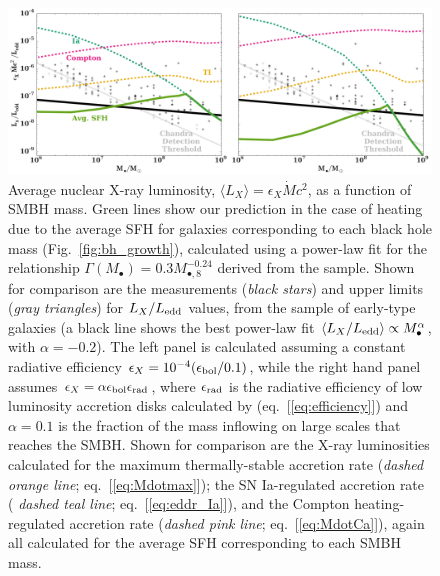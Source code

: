 \documentclass[usenatbib,fleqn]{mn2e}
\newcommand{\Mdot}{\dot{M}}
\newcommand{\Mbheight}{M_{\bullet,8}}
\begin{document}
\begin{figure}
\includegraphics[width=\textwidth]{miller.pdf}
\caption{\label{fig:miller} Average nuclear X-ray luminosity, $\langle
  L_X \rangle = \epsilon_X \Mdot c^2$, as a function of SMBH mass.
  Green lines show our prediction in the case of heating due to the
  average SFH for galaxies corresponding to each black hole mass
  (Fig.~\ref{fig:bh_growth}), calculated using a power-law fit for the
  relationship $\Gamma(M_{\bullet})=0.3 \Mbheight^{-0.24}$ derived from the
  \citet{LauerFaber+:2007a} sample.  Shown for comparison are the
  measurements ({\it black stars}) and upper limits ({\it gray
    triangles}) for $L_X/L_{\rm edd}$ values, from the
  \citet{Miller+15} sample of early-type galaxies (a black line shows
  the best power-law fit $\langle L_X/L_{\rm edd}\rangle \propto
  M_{\bullet}^{\alpha}$, with $\alpha = -0.2$).  The left panel is
  calculated assuming a constant radiative efficiency
  $\epsilon_X=10^{-4} (\epsilon_{\rm bol}/0.1)$, while the right hand
  panel assumes $\epsilon_X= \alpha \epsilon_{\rm bol}\epsilon_{\rm rad}$, where $\epsilon_{\rm rad}$ is the radiative efficiency of low luminosity accretion disks calculated by \citet{Sharma+2007} (eq.~[\ref{eq:efficiency}]) and $\alpha = 0.1$ is the fraction of the mass inflowing on large scales that reaches the SMBH.  Shown
  for comparison are the X-ray luminosities calculated for the maximum
  thermally-stable accretion rate ({\it dashed orange line};
  eq.~[\ref{eq:Mdotmax}]); the SN Ia-regulated accretion rate ({\it
    dashed teal line}; eq.~[\ref{eq:eddr_Ia}]), and the Compton
  heating-regulated accretion rate ({\it dashed pink line};
  eq.~[\ref{eq:MdotCa}]), again all calculated for the average SFH
  corresponding to each SMBH mass.}
\end{figure}
\end{document}
